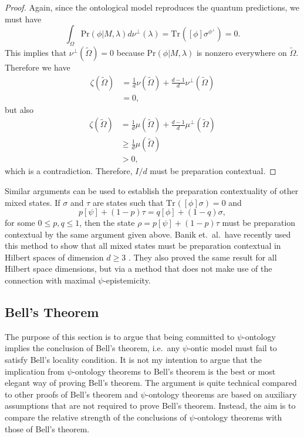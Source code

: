 \documentclass[DIV=calc,paper=a4,fontsize=11pt,twocolumn]{scrartcl} %
\theoremstyle{definition}
\theoremstyle{plain}
\newcommand{\Proj}[1]{\ensuremath{\left [ #1 \right ]}}
\newcommand{\Tr}[2][]{\ensuremath{\text{Tr}_{#1} \left ( #2 \right )}}
\begin{document}
\begin{proof}
Again, since the ontological model reproduces the quantum
predictions, we must have
\begin{equation}
\int_{\Omega} \text{Pr}(\phi|M,\lambda) d\nu^{\perp}(\lambda) =
\Tr{\Proj{\phi}\sigma^{\phi^{\perp}}} = 0.
\end{equation}
This implies that $\nu^{\perp}(\tilde{\Omega}) = 0$ because
$\text{Pr}(\phi|M,\lambda)$ is nonzero everywhere on $\tilde{\Omega}$.
Therefore we have
\begin{align}
\zeta(\tilde{\Omega}) & = \frac{1}{d} \nu(\tilde{\Omega}) +
\frac{d-1}{d} \nu^{\perp}(\tilde{\Omega}) \\
& = 0,
\end{align}
but also
\begin{align}
\zeta(\tilde{\Omega}) & = \frac{1}{d} \mu(\tilde{\Omega}) +
\frac{d-1}{d} \mu^{\perp}(\tilde{\Omega}) \\
& \geq \frac{1}{d} \mu(\tilde{\Omega}) \\
& > 0,
\end{align}
which is a contradiction.  Therefore, $I/d$ must be preparation
contextual.
\end{proof}

Similar arguments can be used to establish the preparation
contextuality of other mixed states.  If $\sigma$ and $\tau$ are states
such that $\Tr{\Proj{\phi}\sigma} = 0$ and
\begin{equation}
p \Proj{\psi} + (1-p)\tau = q \Proj{\phi} + (1-q) \sigma,
\end{equation}
for some $0 \leq p,q \leq 1$, then the state $\rho = p \Proj{\psi} +
(1-p)\tau$ must be preparation contextual by the same argument given
above.  Banik et.\ al.\ have recently used this method to show that
all mixed states must be preparation contextual in Hilbert spaces of
dimension $d \geq 3$ \cite{Banik2014}.  They also proved the same
result for all Hilbert space dimensions, but via a method that does
not make use of the connection with maximal $\psi$-epistemicity.  

\subsection{Bell's Theorem}

\label{Bell}

The purpose of this section is to argue that being committed to
$\psi$-ontology implies the conclusion of Bell's theorem, i.e.\ any
$\psi$-ontic model must fail to satisfy Bell's locality condition.  It
is not my intention to argue that the implication from $\psi$-ontology
theorems to Bell's theorem is the best or most elegant way of proving
Bell's theorem.  The argument is quite technical compared to other
proofs of Bell's theorem and $\psi$-ontology theorems are based on
auxiliary assumptions that are not required to prove Bell's theorem.
Instead, the aim is to compare the relative strength of the
conclusions of $\psi$-ontology theorems with those of Bell's theorem.
\end{document}

